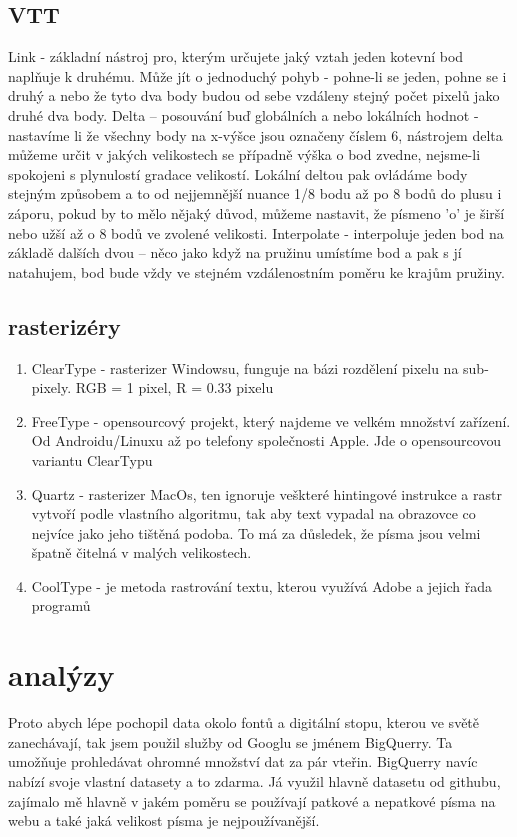 \documentclass[a4paper]{article}
\begin{document}
\subsection{VTT}
Link - základní nástroj pro, kterým určujete jaký vztah jeden kotevní bod naplňuje k druhému. Může jít o jednoduchý pohyb - pohne-li se jeden, pohne se i druhý a nebo že tyto dva body budou od sebe vzdáleny stejný počet pixelů jako druhé dva body. Delta – posouvání buď globálních a nebo lokálních hodnot - nastavíme li že všechny body na x-výšce jsou označeny číslem 6, nástrojem delta můžeme určit v jakých velikostech se případně výška o bod zvedne, nejsme-li spokojeni s plynulostí gradace velikostí. Lokální deltou pak ovládáme body stejným způsobem a to od nejjemnější nuance 1/8 bodu až po 8 bodů do plusu i záporu, pokud by to mělo nějaký důvod, můžeme nastavit, že písmeno 'o' je širší nebo užší až o 8 bodů ve zvolené velikosti. Interpolate - interpoluje jeden bod na základě dalších dvou – něco jako když na pružinu umístíme bod a pak s jí natahujem, bod bude vždy ve stejném vzdálenostním poměru ke krajům pružiny.

\subsection{rasterizéry}
\begin{enumerate}
\item ClearType - rasterizer Windowsu, funguje na bázi rozdělení pixelu na sub-pixely. RGB = 1 pixel, R = 0.33 pixelu

\item FreeType - opensourcový projekt, který najdeme ve velkém množství zařízení. Od Androidu/Linuxu až po telefony společnosti Apple. Jde o opensourcovou variantu ClearTypu

\item Quartz - rasterizer MacOs, ten ignoruje veškteré hintingové instrukce a rastr vytvoří podle vlastního algoritmu, tak aby text vypadal na obrazovce co nejvíce jako jeho tištěná podoba. To má za důsledek, že písma jsou velmi špatně čitelná v malých velikostech.

\item CoolType - je metoda rastrování textu, kterou využívá Adobe a jejich řada programů
\end{enumerate}

\section{analýzy}
Proto abych lépe pochopil data okolo fontů a digitální stopu, kterou ve světě zanechávají, tak jsem použil služby od Googlu se jménem BigQuerry. Ta umožňuje prohledávat ohromné množství dat za pár vteřin. BigQuerry navíc nabízí svoje vlastní datasety a to zdarma. Já využil hlavně datasetu od githubu, zajímalo mě hlavně v jakém poměru se používají patkové a nepatkové písma na webu a také jaká velikost písma je nejpoužívanější.
\end{document}
